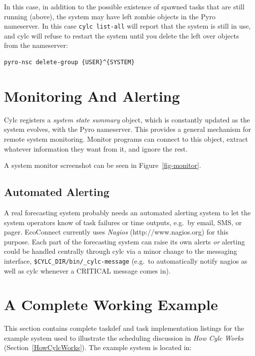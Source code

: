 \documentclass[11pt,a4paper]{article}
\begin{document}
In this case, in addition to the possible existence of spawned tasks
that are still running (above), the system may have left zombie objects
in the Pyro nameserver. In this case \lstinline=cylc list-all= will
report that the system is still in use, and cylc will refuse to restart
the system until you delete the left over objects from the nameserver:

\begin{lstlisting}
pyro-nsc delete-group {USER}^{SYSTEM}
\end{lstlisting}


\pagebreak
\section{Monitoring And Alerting}
\label{SystemMonitor}

Cylc registers a {\em system state summary} object, which is constantly
updated as the system evolves, with the Pyro nameserver. This provides a
general mechanism for remote system monitoring. Monitor programs can
connect to this object, extract whatever information they want from it,
and ignore the rest. 

A system monitor screenshot can be seen in Figure~\ref{fig-monitor}.

\subsection{Automated Alerting}

A real forecasting system probably needs an automated alerting system  
to let the system operators know of task failures or time outputs, e.g.\ 
by email, SMS, or pager.  EcoConnect currently uses {\em Nagios}
(http://www.nagios.org) for this purpose.  Each part of the forecasting
system can raise its own alerts {\em or} alerting could be handled
centrally through cylc via a minor change to the messaging interface,
\lstinline=$CYLC_DIR/bin/_cylc-message= (e.g.\ to automatically notify 
nagios as well as cylc whenever a CRITICAL message comes in).


\pagebreak
\section{A Complete Working Example}
\label{ACompleteWorkingExample}

This section contains complete taskdef and task implementation listings
for the example system used to illustrate the scheduling discussion in
{\em How Cylc Works} (Section~\ref{HowCylcWorks}). The example system
is located in:
\end{document}
